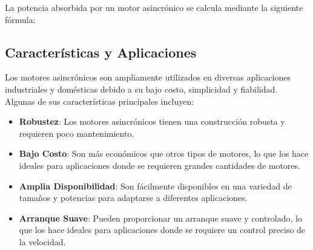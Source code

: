 \documentclass[../main]{subfiles}
\begin{document}

La potencia absorbida por un motor asincrónico se calcula mediante la siguiente fórmula:


\subsection*{Características y Aplicaciones}

Los motores asincrónicos son ampliamente utilizados en diversas aplicaciones industriales y domésticas debido a su bajo costo, simplicidad y fiabilidad. Algunas de sus características principales incluyen:

\begin{itemize}
    \item \textbf{Robustez}: Los motores asincrónicos tienen una construcción robusta y requieren poco mantenimiento.
    \item \textbf{Bajo Costo}: Son más económicos que otros tipos de motores, lo que los hace ideales para aplicaciones donde se requieren grandes cantidades de motores.
    \item \textbf{Amplia Disponibilidad}: Son fácilmente disponibles en una variedad de tamaños y potencias para adaptarse a diferentes aplicaciones.
    \item \textbf{Arranque Suave}: Pueden proporcionar un arranque suave y controlado, lo que los hace ideales para aplicaciones donde se requiere un control preciso de la velocidad.
\end{itemize}
\end{document}
